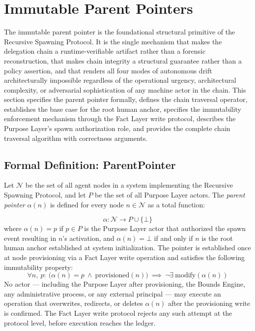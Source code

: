 \section{Immutable Parent Pointers}
\label{sec:immutable-parent-pointers}

The immutable parent pointer is the foundational structural primitive of the Recursive Spawning Protocol. It is the single mechanism that makes the delegation chain a runtime-verifiable artifact rather than a forensic reconstruction, that makes chain integrity a structural guarantee rather than a policy assertion, and that renders all four modes of autonomous drift architecturally impossible regardless of the operational urgency, architectural complexity, or adversarial sophistication of any machine actor in the chain. This section specifies the parent pointer formally, defines the chain traversal operator, establishes the base case for the root human anchor, specifies the immutability enforcement mechanism through the Fact Layer write protocol, describes the Purpose Layer's spawn authorization role, and provides the complete chain traversal algorithm with correctness arguments.

\subsection{Formal Definition: ParentPointer}
\label{sec:parent-pointer-definition}

Let $\mathcal{N}$ be the set of all agent nodes in a \bxthree{} system implementing the Recursive Spawning Protocol, and let $P$ be the set of all Purpose Layer actors. The \emph{parent pointer} $\alpha(n)$ is defined for every node $n \in \mathcal{N}$ as a total function:

\begin{dfn}
\label{dfn:parent-pointer}
\begin{equation}
\alpha : \mathcal{N} \rightarrow P \cup \{\bot\}
\end{equation}
where $\alpha(n) = p$ if $p \in P$ is the Purpose Layer actor that authorized the spawn event resulting in $n$'s activation, and $\alpha(n) = \bot$ if and only if $n$ is the root human anchor established at system initialization. The pointer is established once at node provisioning via a Fact Layer write operation and satisfies the following immutability property:
\begin{equation}
\forall n,\ p:\ \bigl(\alpha(n) = p \ \land \ \text{provisioned}(n)\bigr) \ \implies \ \neg\exists\ \text{modify}(\alpha(n))
\label{eq:parent-pointer-immutability}
\end{equation}
No actor --- including the Purpose Layer after provisioning, the Bounds Engine, any administrative process, or any external principal --- may execute an operation that overwrites, redirects, or deletes $\alpha(n)$ after the provisioning write is confirmed. The Fact Layer write protocol rejects any such attempt at the protocol level, before execution reaches the ledger.
\end{dfn}


